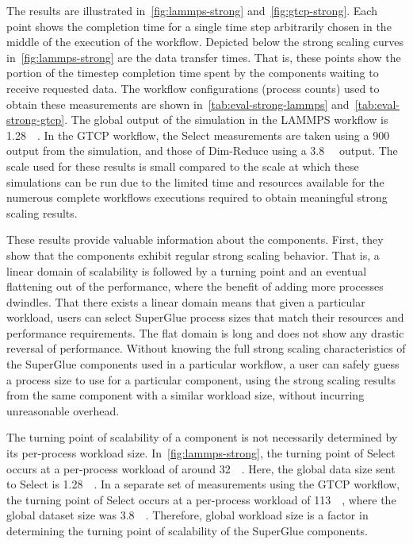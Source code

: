 The results are illustrated in~\autoref{fig:lammps-strong} and~\autoref{fig:gtcp-strong}.
Each point shows
the completion time for a single time step arbitrarily chosen in the middle of
the execution of the workflow. Depicted below the strong scaling curves
in~\autoref{fig:lammps-strong}
are the data transfer times. That is, these points
show the portion of the timestep
completion time spent by the components waiting to receive requested data.
The workflow configurations (process counts) used to obtain these measurements are shown
in~\autoref{tab:eval-strong-lammps} and~\autoref{tab:eval-strong-gtcp}.
The global output of the simulation in the LAMMPS workflow
is \SI{1.28}{\giga\byte}. In the GTCP workflow, the Select
measurements are taken using a \SI{900}{\mega\byte} output
from the simulation, and those of Dim-Reduce using a
\SI{3.8}{\giga\byte} output.
The scale used for these results is small compared to the
scale at which these simulations can be run due to
the limited time and resources available 
for the numerous complete workflows executions required
to obtain meaningful strong scaling results.

These results provide valuable information about the components.
First, they show that the components exhibit regular strong
scaling behavior. That is, 
a linear domain of scalability is followed by a turning point and an
eventual flattening out of the performance, where the benefit
of adding more processes dwindles.
That there exists a linear domain means that given
a particular workload, users can select SuperGlue process sizes
that match their resources and performance requirements.
The flat domain is long and does not show any drastic reversal
of performance. Without knowing the full strong
scaling characteristics of the SuperGlue components used in a particular workflow,
a user can safely guess a process size to use for a particular component,
using the strong scaling results from the same component with a similar
workload size, without incurring unreasonable overhead.

The turning point of scalability of a component
is not necessarily determined by
its per-process workload size.
In~\autoref{fig:lammps-strong}, the turning point of Select
occurs at a per-process workload of around \SI{32}{\mega\byte}.
Here, the global data size sent to Select
is \SI{1.28}{\giga\byte}.
In a separate set of measurements using the GTCP workflow,
the turning point of Select occurs at a per-process workload
of \SI{113}{\mega\byte}, where the global dataset size
was \SI{3.8}{\giga\byte}. Therefore, global workload size
is a factor in determining the turning point of scalability
of the SuperGlue components.

